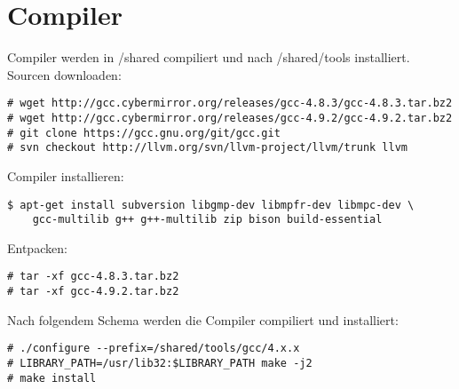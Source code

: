 \chapter{Compiler}
Compiler werden in /shared compiliert und nach /shared/tools installiert.
Sourcen downloaden:
\begin{lstlisting}[style=Bash]
# wget http://gcc.cybermirror.org/releases/gcc-4.8.3/gcc-4.8.3.tar.bz2
# wget http://gcc.cybermirror.org/releases/gcc-4.9.2/gcc-4.9.2.tar.bz2
# git clone https://gcc.gnu.org/git/gcc.git
# svn checkout http://llvm.org/svn/llvm-project/llvm/trunk llvm
\end{lstlisting}
Compiler installieren:
\begin{lstlisting}[style=Bash]
$ apt-get install subversion libgmp-dev libmpfr-dev libmpc-dev \
	gcc-multilib g++ g++-multilib zip bison build-essential
\end{lstlisting}
Entpacken:
\begin{lstlisting}[style=Bash]
# tar -xf gcc-4.8.3.tar.bz2
# tar -xf gcc-4.9.2.tar.bz2
\end{lstlisting}
Nach folgendem Schema werden die Compiler compiliert und installiert:
\begin{lstlisting}[style=Bash]
# ./configure --prefix=/shared/tools/gcc/4.x.x
# LIBRARY_PATH=/usr/lib32:$LIBRARY_PATH make -j2
# make install
\end{lstlisting}
